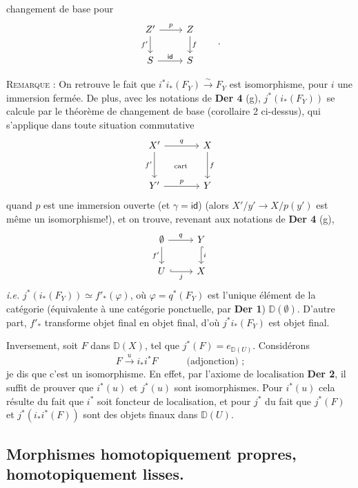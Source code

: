 \documentclass[11pt]{article}
\newcommand{\printedpage}[1]{\marginpar{\footnotesize p.~#1}}
\newcommand{\msp}[1]{\marginpar{\footnotesize [#1]}}
\newcommand{\id}{\mathsf{id}}
\newcommand{\DD}{\mathbb{D}}
\begin{document}
\printedpage{29}

\noindent\msp{page 51}
changement de base pour
\[
\begin{tikzcd}
Z' \arrow[r, "p"] \arrow[d, "f'"'] & Z \arrow[d, "f"] \\
S \arrow[r, "\id"] & S
\end{tikzcd}
\qquad .
\]

\noindent\textsc{Remarque} : On retrouve le fait que $i^*i_*(F_Y) \overset{\sim}{\to} F_Y$ est isomorphisme, pour $i$ une immersion fermée. De plus, avec les notations de \textbf{Der 4} (g), $j^*(i_*(F_Y))$ se calcule par le théorème de changement de base (corollaire 2 ci-dessus), qui s'applique dans toute situation commutative
\[
\begin{tikzcd}[row sep=large, column sep=large]
X' \arrow[r, "q"] \arrow[d, "f'"'] \arrow[dr, phantom, "\text{\scriptsize cart}"] & X \arrow[d, "f"] \\
Y' \arrow[r, "p"] & Y
\end{tikzcd}
\]
quand $p$ est une immersion ouverte (et $\gamma = \id$) (alors $X'/y' \to X/p(y')$ est même un isomorphisme!), et on trouve, revenant aux notations de \textbf{Der 4} (g),
\[
\begin{tikzcd}
\emptyset \arrow[r, "q"] \arrow[d, "f'"'] & Y \arrow[d, hook, "i"] \\
U \arrow[r, hook, "j"'] & X
\end{tikzcd}
\]
\textit{i.e.} $j^*(i_*(F_Y)) \simeq f'_*(\varphi)$, où $\varphi = q^*(F_Y)$ est l'unique élément de la catégorie (équivalente à une catégorie ponctuelle, par \textbf{Der 1}) $\DD(\emptyset)$. D'autre part, $f'_*$ transforme objet final en objet final, d'où $j^*i_*(F_Y)$ est objet final.

Inversement, soit $F$ dans $\DD(X)$, tel que $j^*(F) = e_{\DD(U)}$. Considérons
\[
F \xrightarrow{u} i_*i^*F \qquad\quad \text{(adjonction) ;}
\]
je dis que c'est un isomorphisme. En effet, par l'axiome \msp{page 52} de localisation \textbf{Der 2}, il suffit de prouver que $i^*(u)$ et $j^*(u)$ sont isomorphismes. Pour $i^*(u)$ cela résulte du fait que $i^*$ soit foncteur de localisation, et pour $j^*$ du fait que $j^*(F)$ et $j^*(i_*i^*(F))$ sont des objets finaux dans $\DD(U)$.

\printedpage{30}

\noindent\msp{page 53}

\subsection*{Morphismes homotopiquement propres, homotopiquement lisses.}
\end{document}
